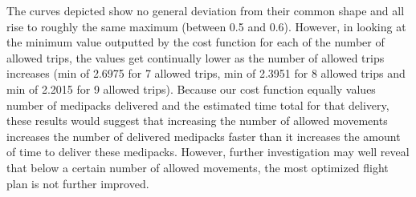 \documentclass[twocolumn,10pt]{asme2ej}
\begin{document}
The curves depicted show no general deviation from their common shape and all rise to roughly the same maximum (between 0.5 and 0.6). However, in looking at the minimum value outputted by the cost function for each of the number of allowed trips, the values get continually lower as the number of allowed trips increases (min of 2.6975 for 7 allowed trips, min of 2.3951 for 8 allowed trips and min of 2.2015 for 9 allowed trips). Because our cost function equally values number of medipacks delivered and the estimated time total for that delivery, these results would suggest that increasing the number of allowed movements increases the number of delivered medipacks faster than it increases the amount of time to deliver these medipacks. However, further investigation may well reveal that below a certain number of allowed movements, the most optimized flight plan is not further improved. 
\end{document}
